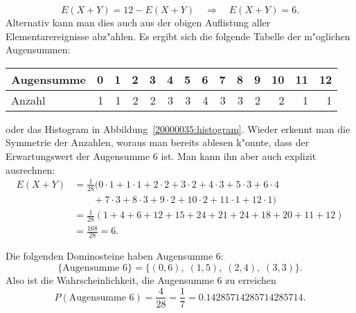 \begin{loesung}
\begin{teilaufgaben}
\[
E(X+Y)= 12-E(X+Y)\quad\Rightarrow\quad E(X+Y)=6.
\]
Alternativ kann man dies auch aus der obigen Auflistung aller
Elementarereignisse abz"ahlen. Es ergibt sich die folgende Tabelle
der m"oglichen Augensummen:
\begin{center}
\begin{tabular}{|l|rrrrrrrrrrrrr|}
\hline
Augensumme & 0& 1& 2& 3& 4& 5& 6& 7& 8& 9& 10& 11& 12\\
\hline
Anzahl     & 1& 1& 2& 2& 3& 3& 4& 3& 3& 2&  2&  1&  1\\
\hline
\end{tabular}
\end{center}
oder das Histogram in Abbildung~\ref{20000035:histogram}.
Wieder erkennt man die Symmetrie der Anzahlen, woraus man bereits
ablesen k"onnte, dass der Erwartungswert der Augensumme $6$ ist.
Man kann ihn aber auch explizit ausrechnen:
\begin{align*}
E(X+Y)&=
\frac1{28}(
0\cdot 1+
1\cdot 1+
2\cdot 2+
3\cdot 2+
4\cdot 3+
5\cdot 3+
6\cdot 4\\
&\qquad +
7\cdot 3+
8\cdot 3+
9\cdot 2+
10\cdot 2+
11\cdot 1+
12\cdot 1
)
\\
&=
\frac1{28}(1+4+6+12+15+24+21+24+18+20+11+12)\\
&=
\frac{168}{28}=6.
\end{align*}
\item
Die folgenden Dominosteine haben Augensumme 6:
\[
\{\text{Augensumme 6}\}
=\{
(0,6),\;
(1,5),\;
(2,4),\;
(3,3)\}.
\]
Also ist die Wahrscheinlichkeit, die Augensumme 6 zu erreichen
\[
P(\text{Augensumme 6})=\frac{4}{28}=\frac17=0.14285714285714285714.
\]
\end{teilaufgaben}
\end{loesung}

